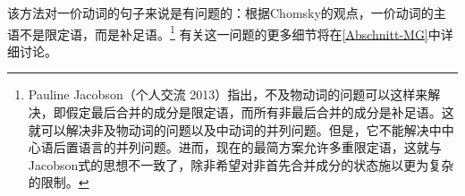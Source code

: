 该方法对一价动词的句子来说是有问题的：根据Chomsky的观点，一价动词的主语不是限定语，而是补足语。\footnote{%
Pauline Jacobson（个人交流 2013）指出，不及物动词的问题可以这样来解决，即假定最后合并的成分是限定语，而所有非最后合并的成分是补足语。这就可以解决非及物动词的问题以及中动词的并列问题。但是，它不能解决中中心语后置语言的并列问题。进而，现在的最简方案允许多重限定语，这就与Jacobson式的思想不一致了，除非希望对非首先合并成分的状态施以更为复杂的限制。
}
有关这一问题的更多细节将在\ref{Abschnitt-MG}中详细讨论。

